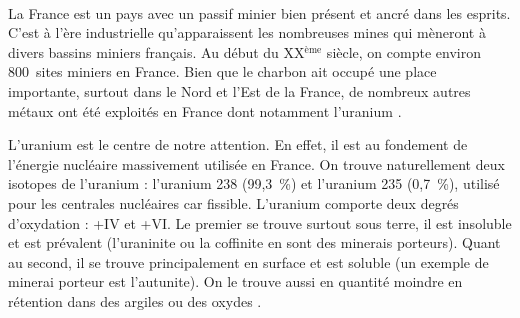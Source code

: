 \documentclass{article}
\begin{document}
\paragraph{} La France est un pays avec un passif minier bien présent et ancré dans les esprits. C’est à l’ère industrielle qu’apparaissent les nombreuses mines qui mèneront à divers bassins miniers français. Au début du XX$^\text{ème}$ siècle, on compte environ 800~sites miniers en France. Bien que le charbon ait occupé une place importante, surtout dans le Nord et l'Est de la France, de nombreux autres métaux ont été exploités en France dont notamment l’uranium \cite{ledoux_notions_2020}.



L’uranium est le centre de notre attention. En effet, il est au fondement de l’énergie nucléaire massivement utilisée en France. On trouve naturellement deux isotopes de l'uranium : l'uranium 238 (99,3~\%) et l'uranium 235 (0,7~\%), utilisé pour les centrales nucléaires car fissible. L'uranium comporte deux degrés d’oxydation : +IV et +VI. Le premier se trouve surtout sous terre, il est insoluble et est prévalent (l'uraninite ou la coffinite en sont des minerais porteurs). Quant au second, il se trouve principalement en surface et est soluble (un exemple de minerai porteur est l'autunite). On le trouve aussi en quantité moindre en rétention dans des argiles ou des oxydes \cite{descostes_introduction_2020}.
\end{document}
